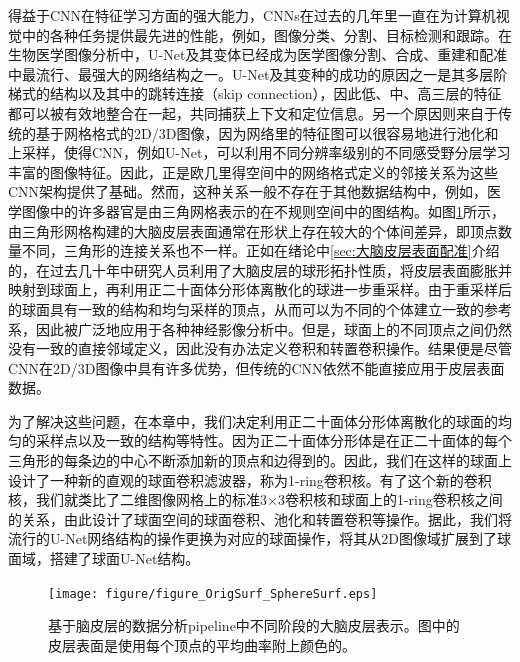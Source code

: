 得益于CNN在特征学习方面的强大能力，CNNs在过去的几年里一直在为计算机视觉中的各种任务提供最先进的性能，例如，图像分类\cite{krizhevsky2012imagenet}、分割\cite{long2015fully}、目标检测和跟踪\cite{ren2015faster}。在生物医学图像分析中，U-Net\cite{ronneberger2015u}及其变体已经成为医学图像分割\cite{cciccek20163d}、合成\cite{nie2016estimating}、重建\cite{xiang2018ultra}和配准\cite{balakrishnan2018unsupervised}中最流行、最强大的网络结构之一。U-Net及其变种的成功的原因之一是其多层阶梯式的结构以及其中的跳转连接（skip connection），因此低、中、高三层的特征都可以被有效地整合在一起，共同捕获上下文和定位信息。另一个原因则来自于传统的基于网格格式的2D/3D图像，因为网络里的特征图可以很容易地进行池化和上采样，使得CNN，例如U-Net，可以利用不同分辨率级别的不同感受野分层学习丰富的图像特征。因此，正是欧几里得空间中的网络格式定义的邻接关系为这些CNN架构提供了基础。然而，这种关系一般不存在于其他数据结构中，例如，医学图像中的许多器官是由三角网格表示的在不规则空间中的图结构。如图\ref{fig:figure_OrigSurf_SphereSurf}所示，由三角形网格\cite{dale1999cortical}构建的大脑皮层表面通常在形状上存在较大的个体间差异，即顶点数量不同，三角形的连接关系也不一样。正如在绪论中\ref{sec:大脑皮层表面配准}介绍的，在过去几十年中研究人员利用了大脑皮层的球形拓扑性质，将皮层表面膨胀并映射到球面上\cite{fischl2012freesurfer}，再利用正二十面体分形体离散化的球\cite{fischl1999cortical}进一步重采样。由于重采样后的球面具有一致的结构和均匀采样的顶点，从而可以为不同的个体建立一致的参考系，因此被广泛地应用于各种神经影像分析中\cite{li2019computational,glasser2013minimal}。但是，球面上的不同顶点之间仍然没有一致的直接邻域定义，因此没有办法定义卷积和转置卷积操作。结果便是尽管CNN在2D/3D图像中具有许多优势，但传统的CNN依然不能直接应用于皮层表面数据。

为了解决这些问题，在本章中，我们决定利用正二十面体分形体离散化的球面的均匀的采样点以及一致的结构等特性。因为正二十面体分形体是在正二十面体的每个三角形的每条边的中心不断添加新的顶点和边\cite{fischl2012freesurfer}得到的。因此，我们在这样的球面上设计了一种新的直观的球面卷积滤波器，称为1-ring卷积核。有了这个新的卷积核，我们就类比了二维图像网格上的标准3$\times$3卷积核和球面上的1-ring卷积核之间的关系，由此设计了球面空间的球面卷积、池化和转置卷积等操作。据此，我们将流行的U-Net网络结构的操作更换为对应的球面操作，将其从2D图像域扩展到了球面域，搭建了球面U-Net结构。

\begin{figure}[t]
    \centering
    \texttt{[image: figure/figure\_OrigSurf\_SphereSurf.eps]}
    \caption{\label{fig:figure_OrigSurf_SphereSurf}基于脑皮层的数据分析pipeline中不同阶段的大脑皮层表示。图中的皮层表面是使用每个顶点的平均曲率附上颜色的。}
\end{figure}



